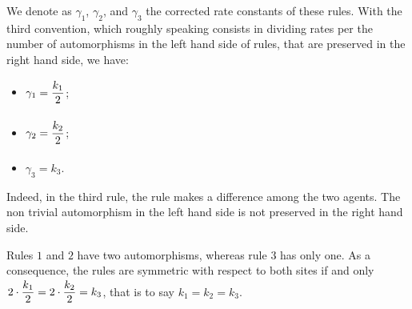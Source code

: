 \documentclass[11pt]{book}
\begin{document}
\begin{center}
\begin{minipage}{0.49\linewidth}
    \centering{}
  \end{minipage}


\begin{minipage}{0.49\linewidth}
  \centering{}
\end{minipage}


\begin{minipage}{0.49\linewidth}
    \centering{}
  \end{minipage}

\end{center}

We denote as $\gamma_1$, $\gamma_2$, and $\gamma_3$ the corrected rate constants of these rules. With the third convention, which roughly speaking consists in dividing rates per the number of automorphisms in the left hand side of rules, that are preserved in the right hand side, we have:
\begin{itemize}
  \item $\gamma_1 = \frac{\strut \displaystyle k_1}{\strut \displaystyle 2}$;
  \item $\gamma_2 = \frac{\strut \displaystyle k_2}{\strut \displaystyle 2}$;
  \item $\gamma_3 = k_3$.
\end{itemize}
Indeed, in the third rule, the rule makes a difference among the two agents.
The non trivial automorphism in the left hand side is not preserved in the right hand side.


Rules $1$ and $2$ have two automorphisms, whereas rule $3$ has only one.
As a consequence, the rules are symmetric with respect to both sites if and only $2\cdot\frac{\strut \displaystyle k_1}{\strut \displaystyle 2}=2\cdot\frac{\strut \displaystyle k_2}{\strut \displaystyle 2}=k_3$, that is to say $k_1=k_2=k_3$.
\end{document}

